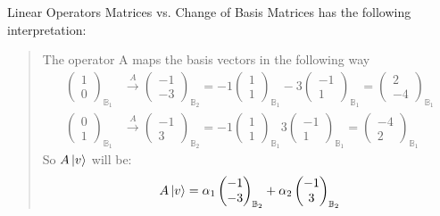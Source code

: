 \begin{example}{Linear Operators Matrices vs. Change of Basis Matrices}
	has the following interpretation:
	\begin{quotation}
		The operator A maps the basis vectors in the following way
		\begin{align*}
			\begin{pmatrix}
				1	\\
				0	
			\end{pmatrix}_{\mathbb{B}_1} & \xrightarrow{A} 
			\begin{pmatrix}
				-1	\\
				-3
			\end{pmatrix}_{\mathbb{B}_2} = 
			-1 \begin{pmatrix}
				1	\\
				1
			\end{pmatrix}_{\mathbb{B}_1}
			-3 \begin{pmatrix}
				-1	\\
				1
			\end{pmatrix}_{\mathbb{B}_1} = 
			\begin{pmatrix}
				2	\\
				-4
			\end{pmatrix}_{\mathbb{B}_1}\\
			\begin{pmatrix}
				0	\\
				1	
			\end{pmatrix}_{\mathbb{B}_1} & \xrightarrow{A} \begin{pmatrix}
				-1	\\
				3
			\end{pmatrix}_{\mathbb{B}_2} = 
			-1 \begin{pmatrix}
				1	\\
				1
			\end{pmatrix}_{\mathbb{B}_1}
			3 \begin{pmatrix}
				-1	\\
				1
			\end{pmatrix}_{\mathbb{B}_1} = 
			\begin{pmatrix}
				-4	\\
				2
			\end{pmatrix}_{\mathbb{B}_1}
		\end{align*}
		So $ A\ket{v} $ will be:
		\[ A\ket{v} = 
		\alpha_1 \begin{pmatrix}
			-1	\\
			-3
		\end{pmatrix}_{\mathbb{B}_2} + 
		\alpha_2 \begin{pmatrix}
			-1	\\
			3
		\end{pmatrix}_{\mathbb{B}_2}
		 \]
	\end{quotation}
	

\end{example}
